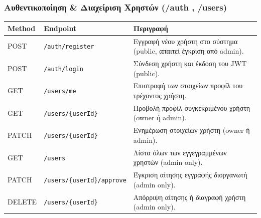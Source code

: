 \documentclass[12pt]{fphw}
\newcommand{\en}[1]{\foreignlanguage{english}{#1}}
\begin{document}
\subsubsection{Αυθεντικοποίηση \& Διαχείριση Χρηστών (/auth , /users)}
\begin{table}[h!]
    \centering
    \small
    \begin{tabularx}{\textwidth}{llX}
    \toprule
    \textbf{Method} & \textbf{Endpoint} & \textbf{Περιγραφή} \\
    \midrule
    \en{POST} & \en{\texttt{/auth/register}} & Εγγραφή νέου χρήστη στο σύστημα (\en{public}, απαιτεί έγκριση από \en{admin}). \\
    \addlinespace[1pt]
    \en{POST} & \en{\texttt{/auth/login}} & Σύνδεση χρήστη και έκδοση του \en{JWT} (\en{public}). \\
    \addlinespace[1pt]
    \en{GET} & \en{\texttt{/users/me}} & Επιστροφή των στοιχείων προφίλ του τρέχοντος χρήστη. \\
    \addlinespace[1pt]
    \en{GET} & \en{\texttt{/users/\{userId\}}} & Προβολή προφίλ συγκεκριμένου χρήστη (\en{owner} ή \en{admin}). \\
    \addlinespace[1pt]
    \en{PATCH} & \en{\texttt{/users/\{userId\}}} & Ενημέρωση στοιχείων χρήστη (\en{owner} ή \en{admin}). \\
    \addlinespace[1pt]
    \en{GET} & \en{\texttt{/users}} & Λίστα όλων των εγγεγραμμένων χρηστών (\en{admin only}). \\
    \addlinespace[1pt]
    \en{PATCH} & \en{\texttt{/users/\{userId\}/approve}} & Έγκριση αίτησης εγγραφής διοργανωτή (\en{admin only}). \\
    \addlinespace[1pt]
    \en{DELETE} & \en{\texttt{/users/\{userId\}}} & Απόρριψη αίτησης ή διαγραφή χρήστη (\en{admin only}). \\
    \bottomrule
    \end{tabularx}
\end{table}
\end{document}
